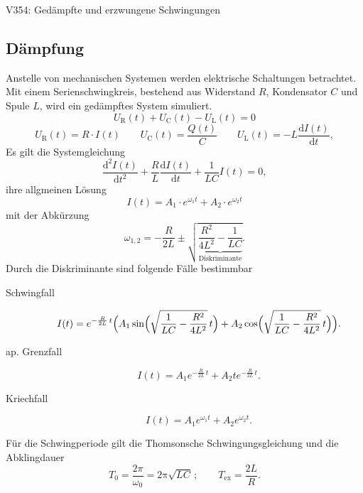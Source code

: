 \begin{Versuch}{V354: Gedämpfte und erzwungene Schwingungen}
\begin{Theorie}
    	\section*{Dämpfung}
       	Anstelle von mechanischen Systemen werden elektrische Schaltungen betrachtet.
       	Mit einem Serienschwingkreis, bestehend aus Widerstand $R$, Kondensator $C$ und Spule $L$, wird ein gedämpftes System simuliert.
       	\begin{equation}
			U_\text{R}(t)+U_\text{C}(t)-U_\text{L}(t)=0
			\label{systemgleichung}
		\end{equation}
		\begin{equation}
			U_\text{R}(t) = R\cdot I(t)\qquad
			U_\text{C}(t) = \frac{Q(t)}{C}\qquad
			U_\text{L}(t) = -L\frac{\mathup{d}I(t)}{\mathup{d}t},
		\label{eq:austauscher}
		\end{equation}
		Es gilt die Systemgleichung 
		\begin{equation}
			\frac{\mathup{d^2}I(t)}{\mathup{d}t^2}+\frac{{R}}{{L}}\frac{\mathup{d}I(t)}{\mathup{d}t}+\frac{1}{{LC}}I(t)=0,
		\end{equation}
		ihre allgmeinen Lösung
		\begin{equation}
			I(t) = A_1\cdot e^{{\omega_1}t} +A_2\cdot e^{{\omega_2}t}
			\label{eq:allgloesung}
		\end{equation}
		mit der Abkürzung
		\begin{equation}
			{\omega_{1,2}}= -\frac{{R}}{2{L}}\pm\sqrt{\underbrace{\frac{{R^2}}{4{L^2}}-\frac{1}{{LC}}}_{\text{Diskriminante}}}.
			\label{eq:allomega}
		\end{equation}
		Durch die Diskriminante sind folgende Fälle bestimmbar
		\begin{description}
			\item [Schwingfall] \begin{equation}
									I(t) = e^{-\frac{{R}}{2{L}}\,t}\Bigl(A_1 \sin\Bigl(\sqrt{\frac{1}{{LC}}-\frac{{R^2}}{4{L^2}}}\, t\Bigr)+A_2 \cos\Bigl(\sqrt{\frac{1}{{LC}}-\frac{{R^2}}{4{L^2}}}\,t\Bigr)\Bigr).
								\end{equation}
			\item [ap. Grenzfall] \begin{equation}
									I(t) = A_1 e^{-\frac{{R}}{2{L}}\,t}+A_2 t e^{-\frac{{R}}{2{L}}\,t}.
								  \end{equation}
			\item [Kriechfall] \begin{equation}
									I(t)= A_1 e^{\omega_1 t} + A_2 e^{\omega_2 t}.
								 \end{equation}
		\end{description}
		Für die Schwingperiode gilt die Thomsonsche Schwingungsgleichung und die Abklingdauer
		\begin{equation}
			T_0 = \frac{2π}{{ω_0}} = \mathup{2π} \sqrt{LC}\,;\qquad T_\text{ex} = \frac{{2L}}{{R}}.
			\label{eq:thomson}
		\end{equation} 
	

\end{Theorie}
\end{Versuch}

